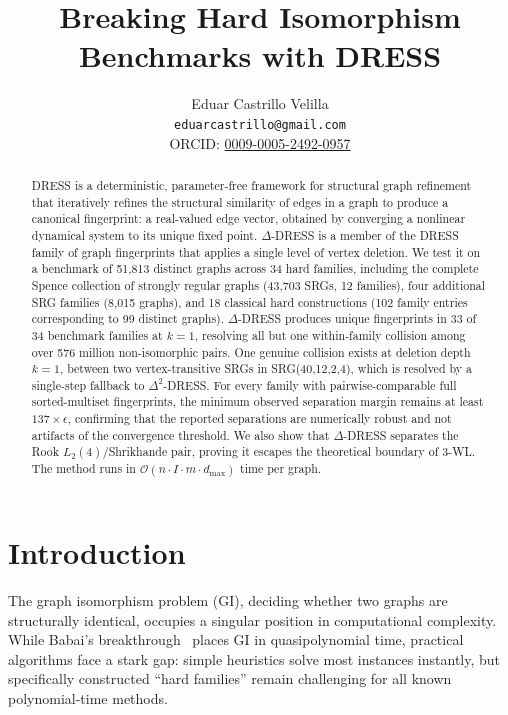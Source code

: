 \documentclass[11pt,a4paper]{article}
\title{Breaking Hard Isomorphism Benchmarks with DRESS}
\author{Eduar Castrillo Velilla \\ \texttt{eduarcastrillo@gmail.com} \\ ORCID: \href{https://orcid.org/0009-0005-2492-0957}{0009-0005-2492-0957}}
\date{}
\begin{document}
\maketitle

\begin{abstract}
DRESS is a deterministic, parameter-free framework for structural graph refinement that iteratively refines the structural similarity of edges in a graph to produce a canonical fingerprint: a real-valued edge vector, obtained by converging a nonlinear dynamical system to its unique fixed point.
$\Delta$-DRESS is a member of the DRESS family of graph fingerprints that applies a single level of vertex deletion.
We test it on a benchmark of 51{,}813 distinct graphs across 34 hard families, including the complete Spence collection of strongly regular graphs (43{,}703 SRGs, 12 families), four additional SRG families (8{,}015 graphs), and 18 classical hard constructions (102 family entries corresponding to 99 distinct graphs).
$\Delta$-DRESS produces unique fingerprints in 33 of 34 benchmark families at $k=1$, resolving all but one within-family collision among over 576 million non-isomorphic pairs.
One genuine collision exists at deletion depth $k=1$, between two vertex-transitive SRGs in SRG(40,12,2,4), which is resolved by a single-step fallback to $\Delta^2$-DRESS.
For every family with pairwise-comparable full sorted-multiset fingerprints, the minimum observed separation margin remains at least $137 \times \epsilon$, confirming that the reported separations are numerically robust and not artifacts of the convergence threshold.
We also show that $\Delta$-DRESS separates the Rook $L_2(4)$/Shrikhande pair, proving it escapes the theoretical boundary of 3-WL.
The method runs in $\mathcal{O}(n \cdot I \cdot m \cdot d_{\max})$ time per graph.
\end{abstract}


\section{Introduction}

The graph isomorphism problem (GI), deciding whether two graphs are structurally identical, occupies a singular position in computational complexity.
While Babai's breakthrough~\cite{babai2016graph} places GI in quasipolynomial time, practical algorithms face a stark gap: simple heuristics solve most instances instantly, but specifically constructed ``hard families'' remain challenging for all known polynomial-time methods.
\end{document}

